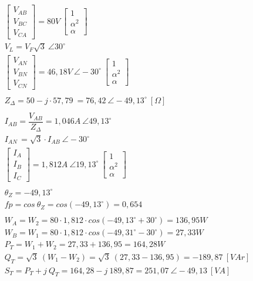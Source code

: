 \documentclass[a4paper,12pt,oneside,openany,table,xcdraw]{article}
\begin{document}
\begin{gather*}
 \begin{array}{l}
\begin{bmatrix}
V_{AB}\\
V_{BC}\\
V_{CA}
\end{bmatrix} =80V\ \begin{bmatrix}
1\\
\alpha ^{2}\\
\alpha 
\end{bmatrix}\\
V_{L} =V_{F}\sqrt{3} \ \angle 30^{\circ }\\
\begin{bmatrix}
V_{AN}\\
V_{BN}\\
V_{CN}
\end{bmatrix} =46,18V\ \angle -30^{\circ } \ \begin{bmatrix}
1\\
\alpha ^{2}\\
\alpha 
\end{bmatrix}\\
\\
Z_{\Delta } =50-j\cdotp 57,79\ =76,42\ \angle -49,13^{\circ } \ [ \Omega ]\\
\\
I_{AB} =\dfrac{V_{AB}}{Z_{\Delta }} =1,046A\ \angle 49,13^{\circ }\\
I_{AN\ } =\sqrt{3} \cdotp I_{AB} \ \angle -30^{\circ }\\
\begin{bmatrix}
I_{A}\\
I_{B}\\
I_{C}
\end{bmatrix} =1,812A\ \angle 19,13^{\circ } \ \begin{bmatrix}
1\\
\alpha ^{2}\\
\alpha 
\end{bmatrix}\\
\\
\theta _{Z} =-49,13^{\circ }\\
fp=cos\ \theta _{Z} =cos\left( -49,13^{\circ }\right) =0,654\\
\\
W_{A} =W_{2} =80\cdotp 1,812\cdotp cos\left( -49,13^{\circ } +30^{\circ }\right) =136,95W\\
W_{B} =W_{1} =80\cdotp 1,812\cdotp cos\left( -49,31^{\circ } -30^{\circ }\right) =27,33W\\
P_{T} =W_{1} +W_{2} =27,33+136,95=164,28W\\
Q_{T} =\sqrt{3} \ ( W_{1} -W_{2}) =\sqrt{3} \ ( 27,33-136,95) =-189,87\ [ VAr]\\
S_{T} =P_{T} +j\ Q_{T} =164,28-j\ 189,87=251,07\ \angle -49,13\ [ VA]
\end{array}
\end{gather*}
\end{document}
